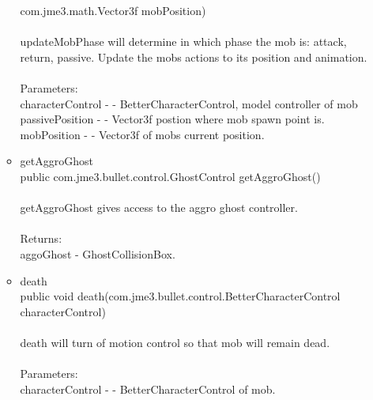 \documentclass[letterpaper]{article}
\begin{document}
\begin{itemize}
\begin{itemize}
													com.jme3.math.Vector3f mobPosition) \\ \\
													updateMobPhase will determine in which phase the mob is: attack, return, passive. Update the mobs actions to its position and animation. \\ \\
													Parameters: \\
													characterControl - - BetterCharacterControl, model controller of mob
													passivePosition - - Vector3f postion where mob spawn point is. \\
													mobPosition - - Vector3f of mobs current position.
											\item	getAggroGhost \\
													public com.jme3.bullet.control.GhostControl getAggroGhost() \\ \\
													getAggroGhost gives access to the aggro ghost controller. \\ \\
													Returns: \\
													aggoGhost - GhostCollisionBox. \\
											\item	death \\
													public void death(com.jme3.bullet.control.BetterCharacterControl characterControl) \\ \\
													death will turn of motion control so that mob will remain dead. \\ \\
													Parameters: \\
													characterControl - - BetterCharacterControl of mob. \\
										\end{itemize}
							\end{itemize}
							
							\vspace{0.2in}
\end{document}
